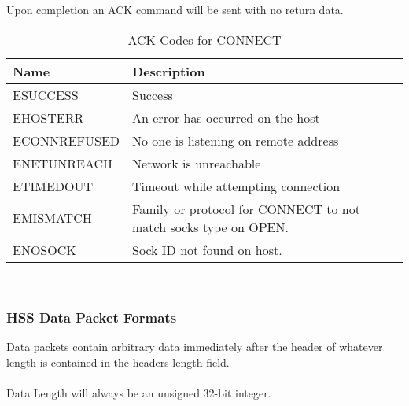 \documentclass[10pt]{article}
\begin{document}
    Upon completion an ACK command will be sent with no return data. 
	\\
	\begin{table}[H]
		\begin{center}
			\caption{ACK Codes for CONNECT}
			\label{tab:connErrTable}
			\begin{tabular}{l|l} 
				\rowcolor{lightgray}
				\textbf{Name} & \textbf{Description}\\
				\hline
				ESUCCESS & Success\\
				EHOSTERR & An error has occurred on the host\\
				ECONNREFUSED & No one is listening on remote address\\
				ENETUNREACH & Network is unreachable\\
				ETIMEDOUT & Timeout while attempting connection\\
				EMISMATCH & Family or protocol for CONNECT to not match socks type on OPEN.\\
				ENOSOCK & Sock ID not found on host. \\
			\end{tabular}
		\end{center}
	\end{table} \mbox{}\\
	\subsubsection{HSS Data Packet Formats} \mbox{}
	Data packets contain arbitrary data immediately after the header of whatever length is contained in the headers length field. \\
	\\
	Data Length will always be an unsigned 32-bit integer. 
\end{document}
